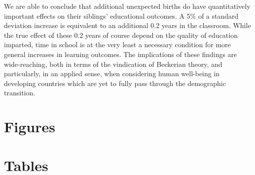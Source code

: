 \documentclass[subeqn]{article}
\newcommand{\twinfolder}{"/home/damian/investigacion/Activa/Twins"}
\begin{document}
\begin{spacing}{1.4}
We are able to conclude that additional unexpected births do have
quantitatively important effects on their siblings' educational outcomes.  
A 5\% of a standard deviation increase is equivalent to an additional 0.2
years in the classroom.  While the true effect of these 0.2 years of course
depend on the quality of education imparted, time in school is at the very 
least a necessary condition for more general increases in learning outcomes.  
The implications of these findings are wide-reaching, both in terms of the 
vindication of Beckerian theory, and particularly, in an applied sense, when 
considering human well-being in developing countries which are yet to fully 
pass through the demographic transition.



\newpage
\section*{Figures}


\clearpage
\section*{Tables}

\clearpage







\begin{landscape}

\end{landscape}




\clearpage




\end{spacing}
\end{document}
